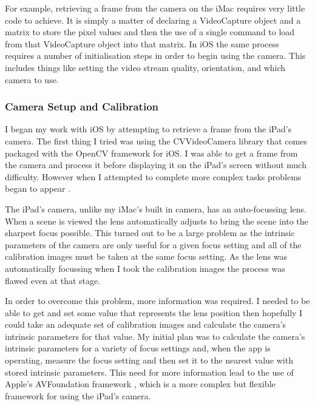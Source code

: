 \documentclass{article}
\begin{document}
For example, retrieving a frame from the camera on the iMac requires very little code to achieve. It is simply a matter of declaring a VideoCapture object and a matrix to store the pixel values and then the use of a single command to load from that VideoCapture object into that matrix. In iOS the same process requires a number of initialisation steps in order to begin using the camera. This includes things like setting the video stream quality, orientation, and which camera to use. \par

\subsubsection{Camera Setup and Calibration}

I began my work with iOS by attempting to retrieve a frame from the iPad's camera. The first thing I tried was using the CVVideoCamera library that comes packaged with the OpenCV framework for iOS. I was able to get a frame from the camera and process it before displaying it on the iPad's screen without much difficulty. However when I attempted to complete more complex tasks problems began to appear \cite{iOS}. \par

The iPad's camera, unlike my iMac's built in camera, has an auto-focussing lens. When a scene is viewed the lens automatically adjusts to bring the scene into the sharpest focus possible. This turned out to be a large problem as the intrinsic parameters of the camera are only useful for a given focus setting and all of the calibration images must be taken at the same focus setting. As the lens was automatically focussing when I took the calibration images the process was flawed even at that stage. \par

In order to overcome this problem, more information was required. I needed to be able to get and set some value that represents the lens position \cite{xamarin} then hopefully I could take an adequate set of calibration images and calculate the camera's intrinsic parameters for that value. My initial plan was to calculate the camera's intrinsic parameters for a variety of focus settings and, when the app is operating, measure the focus setting and then set it to the nearest value with stored intrinsic parameters. This need for more information lead to the use of Apple's AVFoundation framework \cite{apple_class}, which is a more complex but flexible framework for using the iPad's camera. 
\end{document}
